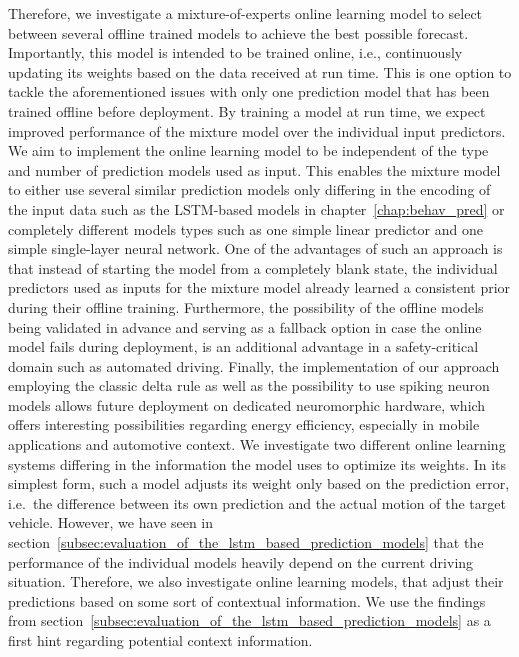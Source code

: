 Therefore, we investigate a mixture-of-experts online learning model to select between several offline trained models to achieve the best possible forecast.
Importantly, this model is intended to be trained online, i.e., continuously updating its weights based on the data received at run time.
This is one option to tackle the aforementioned issues with only one prediction model that has been trained offline before deployment.
By training a model at run time, we expect improved performance of the mixture model over the individual input predictors.
We aim to implement the online learning model to be independent of the type and number of prediction models used as input.
This enables the mixture model to either use several similar prediction models only differing in the encoding of the input data such as the \ac{LSTM}-based models in chapter~\ref{chap:behav_pred} or completely different models types such as one simple linear predictor and one simple single-layer neural network.
One of the advantages of such an approach is that instead of starting the model from a completely blank state, the individual predictors used as inputs for the mixture model already learned a consistent prior during their offline training.
Furthermore, the possibility of the offline models being validated in advance and serving as a fallback option in case the online model fails during deployment, is an additional advantage in a safety-critical domain such as automated driving.
Finally, the implementation of our approach employing the classic delta rule as well as the possibility to use spiking neuron models allows future deployment on dedicated neuromorphic hardware, which offers interesting possibilities regarding energy efficiency, especially in mobile applications and automotive context.
We investigate two different online learning systems differing in the information the model uses to optimize its weights.
In its simplest form, such a model adjusts its weight only based on the prediction error, i.e.\ the difference between its own prediction and the actual motion of the target vehicle.
However, we have seen in section~\ref{subsec:evaluation_of_the_lstm_based_prediction_models} that the performance of the individual models heavily depend on the current driving situation.
Therefore, we also investigate online learning models, that adjust their predictions based on some sort of contextual information.
We use the findings from section~\ref{subsec:evaluation_of_the_lstm_based_prediction_models} as a first hint regarding potential context information.

